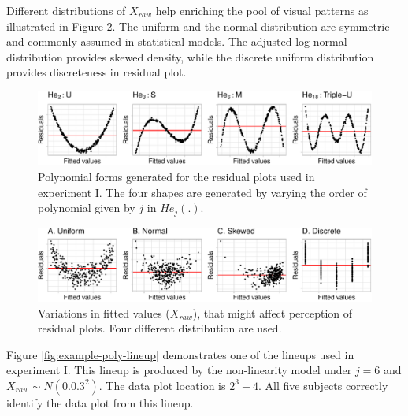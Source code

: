 \documentclass[]{interact}
\theoremstyle{plain}%
\theoremstyle{definition}
\theoremstyle{remark}
\begin{document}
Different distributions of \(X_{raw}\) help enriching the pool of visual
patterns as illustrated in Figure \ref{fig:different-dist}. The uniform
and the normal distribution are symmetric and commonly assumed in
statistical models. The adjusted log-normal distribution provides skewed
density, while the discrete uniform distribution provides discreteness
in residual plot.

\begin{figure}

{\centering \includegraphics[width=1\linewidth]{paper_comparison_files/figure-latex/different-shape-of-herimite-1} 

}

\caption{Polynomial forms generated for the residual plots used in experiment I. The four shapes are generated by varying the order of polynomial given by $j$ in $He_j(.)$.}\label{fig:different-shape-of-herimite}
\end{figure}

\begin{figure}

{\centering \includegraphics[width=1\linewidth]{paper_comparison_files/figure-latex/different-dist-1} 

}

\caption{Variations in fitted values ($X_{raw}$), that might affect perception of residual plots. Four different distribution are used.}\label{fig:different-dist}
\end{figure}

Figure \ref{fig:example-poly-lineup} demonstrates one of the lineups
used in experiment I. This lineup is produced by the non-linearity model
under \(j = 6\) and \(X_{raw} \sim N(0.0.3^2)\). The data plot location
is \(2^3 - 4\). All five subjects correctly identify the data plot from
this lineup.
\end{document}
